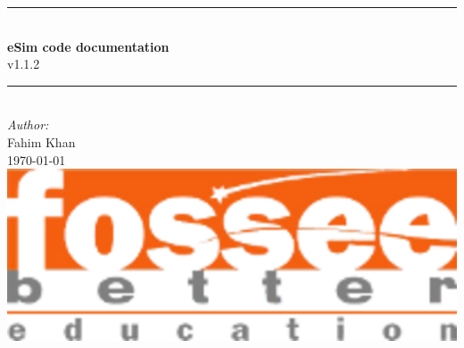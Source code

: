 \documentclass[12pt]{article}
\begin{document}
\begin{titlepage}




\newcommand{\HRule}{\rule{\linewidth}{0.5mm}} %

\center %
 

\HRule \\[0.4cm]
{ \huge \bfseries eSim code documentation}\\[0.4cm] %
{\small v1.1.2}
\HRule \\[1.5cm]
 

\Large \emph{Author:}\\
Fahim Khan\\[3cm] %


{\large \today}\\[2cm] %


\includegraphics{fossee-logo.png}\\[1cm] %
 

\vfill %

\end{titlepage}
\end{document}
